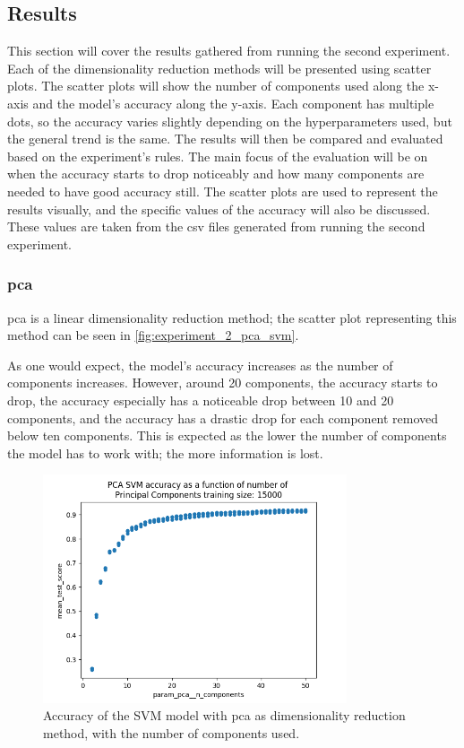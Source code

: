 \subsection{Results}\label{subsec:experiment_2_results}
This section will cover the results gathered from running the second experiment. Each of the dimensionality reduction methods will be presented using scatter plots. The scatter plots will show the number of components used along the x-axis and the model's accuracy along the y-axis. Each component has multiple dots, so the accuracy varies slightly depending on the hyperparameters used, but the general trend is the same. The results will then be compared and evaluated based on the experiment's rules. The main focus of the evaluation will be on when the accuracy starts to drop noticeably and how many components are needed to have good accuracy still. The scatter plots are used to represent the results visually, and the specific values of the accuracy will also be discussed. These values are taken from the csv files generated from running the second experiment.

\subsubsection{\gls{pca}}\label{subsubsec:experiment_2_pca}
\gls{pca} is a linear dimensionality reduction method; the scatter plot representing this method can be seen in \autoref{fig:experiment_2_pca_svm}.

As one would expect, the model's accuracy increases as the number of components increases. However, around 20 components, the accuracy starts to drop, the accuracy especially has a noticeable drop between 10 and 20 components, and the accuracy has a drastic drop for each component removed below ten components. This is expected as the lower the number of components the model has to work with; the more information is lost.

\begin{figure}[htb!]
    \centering
    \includegraphics[width=0.8\textwidth]{figures/experiment_two/pca_svm_15000.png}
    \caption{Accuracy of the SVM model with \gls{pca} as dimensionality reduction method, with the number of components used.}
    \label{fig:experiment_2_pca_svm}
\end{figure}

